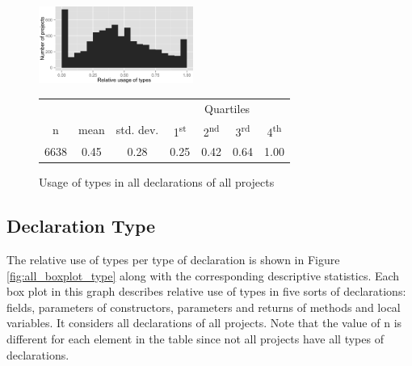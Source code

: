 \documentclass[preprint]{sigplanconf}
\newcommand{\ts}{\textsuperscript}
\begin{document}
\begin{figure}[h]
\centering 
\includegraphics[width=0.45\textwidth]{../analysis/result/all/histograms/5_all_types.png} 

\vspace{0.3cm}
\small
\begin{tabular}{|c|c|c|cccc|}
\hline
{}		&  {}		&  {}			&  \multicolumn{4}{c|}{Quartiles}				\\
n		& mean	& std. dev.	& 1\ts{st}	& 2\ts{nd}	& 3\ts{rd}	& 4\ts{th}		\\
\hline
\hline
6638 	& 0.45	& 0.28		& 0.25	& 0.42		& 0.64	& 1.00		\\
\hline
\end{tabular}


\caption{Usage of types in all declarations of all projects}
\label{fig:all_histogram_all} 
\end{figure}



\subsection{Declaration Type\label{sub:res_all_type}}
The relative use of types per type of declaration is shown in Figure \ref{fig:all_boxplot_type} along with the corresponding descriptive statistics.
Each box plot in this graph describes relative use of types in five sorts of declarations: fields, parameters of constructors, parameters and returns of methods and local variables.
It considers all declarations of all projects.
Note that the value of n is different for each element in the table since not all projects have all types of declarations. 
\end{document}

